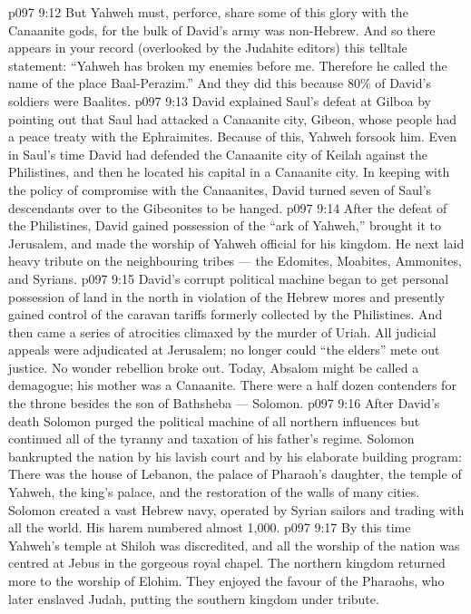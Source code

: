 \vs p097 9:12 But Yahweh must, perforce, share some of this glory with the Canaanite gods, for the bulk of David’s army was non\hyp{}Hebrew. And so there appears in your record (overlooked by the Judahite editors) this telltale statement: “Yahweh has broken my enemies before me. Therefore he called the name of the place Baal\hyp{}Perazim.” And they did this because 80\% of David’s soldiers were Baalites.
\vs p097 9:13 David explained Saul’s defeat at Gilboa by pointing out that Saul had attacked a Canaanite city, Gibeon, whose people had a peace treaty with the Ephraimites. Because of this, Yahweh forsook him. Even in Saul’s time David had defended the Canaanite city of Keilah against the Philistines, and then he located his capital in a Canaanite city. In keeping with the policy of compromise with the Canaanites, David turned seven of Saul’s descendants over to the Gibeonites to be hanged.
\vs p097 9:14 After the defeat of the Philistines, David gained possession of the “ark of Yahweh,” brought it to Jerusalem, and made the worship of Yahweh official for his kingdom. He next laid heavy tribute on the neighbouring tribes --- the Edomites, Moabites, Ammonites, and Syrians.
\vs p097 9:15 David’s corrupt political machine began to get personal possession of land in the north in violation of the Hebrew mores and presently gained control of the caravan tariffs formerly collected by the Philistines. And then came a series of atrocities climaxed by the murder of Uriah. All judicial appeals were adjudicated at Jerusalem; no longer could “the elders” mete out justice. No wonder rebellion broke out. Today, Absalom might be called a demagogue; his mother was a Canaanite. There were a half dozen contenders for the throne besides the son of Bathsheba --- Solomon.
\vs p097 9:16 \pc After David’s death Solomon purged the political machine of all northern influences but continued all of the tyranny and taxation of his father’s regime. Solomon bankrupted the nation by his lavish court and by his elaborate building program: There was the house of Lebanon, the palace of Pharaoh’s daughter, the temple of Yahweh, the king’s palace, and the restoration of the walls of many cities. Solomon created a vast Hebrew navy, operated by Syrian sailors and trading with all the world. His harem numbered almost 1,000.
\vs p097 9:17 \pc By this time Yahweh’s temple at Shiloh was discredited, and all the worship of the nation was centred at Jebus in the gorgeous royal chapel. The northern kingdom returned more to the worship of Elohim. They enjoyed the favour of the Pharaohs, who later enslaved Judah, putting the southern kingdom under tribute.
